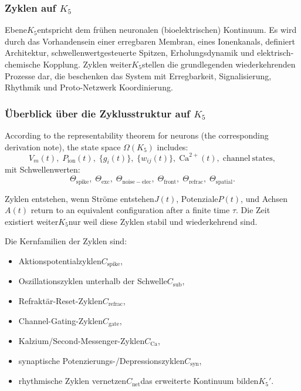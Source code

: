 
\subsubsection{Zyklen auf \texorpdfstring{$K_5$}{K_5}}
\label{sec:cycles-k5}

Ebene$K_5$entspricht dem frühen neuronalen (bioelektrischen) Kontinuum.
Es wird durch das Vorhandensein einer erregbaren Membran, eines Ionenkanals, definiert
Architektur, schwellenwertgesteuerte Spitzen, Erholungsdynamik und
elektrisch-chemische Kopplung.
Zyklen weiter$K_5$stellen die grundlegenden wiederkehrenden Prozesse dar, die beschenken
das System mit Erregbarkeit, Signalisierung, Rhythmik und Proto-Netzwerk
Koordinierung.

\subsubsection{Überblick über die Zyklusstruktur auf \texorpdfstring{$K_5$}{K_5}}

According to the representability theorem for neurons (the corresponding derivation note),
the state space $\Omega(K_5)$ includes:
\[
  V_m(t),\;
  P_{\mathrm{ion}}(t),\;
  \{g_i(t)\},\;
  \{w_{ij}(t)\},\;
  \mathrm{Ca}^{2+}(t),\;
  \mathrm{channel\ states},
\]
mit Schwellenwerten:
\[
  \Theta_{\mathrm{spike}},\;
  \Theta_{\mathrm{exc}},\;
  \Theta_{\mathrm{noise-elec}},\;
  \Theta_{\mathrm{front}},\;
  \Theta_{\mathrm{refrac}},\;
  \Theta_{\mathrm{spatial}}.
\]

Zyklen entstehen, wenn Ströme entstehen$J(t)$, Potenziale$P(t)$, und Achsen$A(t)$
return to an equivalent configuration after a finite time $\tau$.
Die Zeit existiert weiter$K_5$nur weil diese Zyklen stabil und wiederkehrend sind.

Die Kernfamilien der Zyklen sind:

\begin{itemize}
  \item Aktionspotentialzyklen$C_{\mathrm{spike}}$,
  \item Oszillationszyklen unterhalb der Schwelle$C_{\mathrm{sub}}$,
  \item Refraktär-Reset-Zyklen$C_{\mathrm{refrac}}$,
  \item Channel-Gating-Zyklen$C_{\mathrm{gate}}$,
  \item Kalzium/Second-Messenger-Zyklen$C_{\mathrm{Ca}}$,
  \item synaptische Potenzierungs-/Depressionszyklen$C_{\mathrm{syn}}$,
  \item rhythmische Zyklen vernetzen$C_{\mathrm{net}}$das erweiterte Kontinuum bilden$K_5'$.
\end{itemize}

